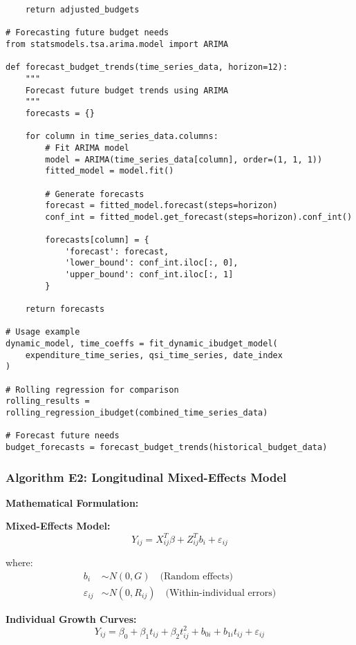 \begin{lstlisting}
    return adjusted_budgets

# Forecasting future budget needs
from statsmodels.tsa.arima.model import ARIMA

def forecast_budget_trends(time_series_data, horizon=12):
    """
    Forecast future budget trends using ARIMA
    """
    forecasts = {}
    
    for column in time_series_data.columns:
        # Fit ARIMA model
        model = ARIMA(time_series_data[column], order=(1, 1, 1))
        fitted_model = model.fit()
        
        # Generate forecasts
        forecast = fitted_model.forecast(steps=horizon)
        conf_int = fitted_model.get_forecast(steps=horizon).conf_int()
        
        forecasts[column] = {
            'forecast': forecast,
            'lower_bound': conf_int.iloc[:, 0],
            'upper_bound': conf_int.iloc[:, 1]
        }
    
    return forecasts

# Usage example
dynamic_model, time_coeffs = fit_dynamic_ibudget_model(
    expenditure_time_series, qsi_time_series, date_index
)

# Rolling regression for comparison
rolling_results = rolling_regression_ibudget(combined_time_series_data)

# Forecast future needs
budget_forecasts = forecast_budget_trends(historical_budget_data)
\end{lstlisting}

\subsubsection{Algorithm E2: Longitudinal Mixed-Effects Model}

\textbf{Mathematical Formulation:}

\textbf{Mixed-Effects Model:}
\begin{equation}
Y_{ij} = X_{ij}^T\beta + Z_{ij}^T b_i + \varepsilon_{ij}
\end{equation}

where:
\begin{align}
b_i &\sim N(0, G) \quad \text{(Random effects)} \\
\varepsilon_{ij} &\sim N(0, R_{ij}) \quad \text{(Within-individual errors)}
\end{align}

\textbf{Individual Growth Curves:}
\begin{equation}
Y_{ij} = \beta_0 + \beta_1 t_{ij} + \beta_2 t_{ij}^2 + b_{0i} + b_{1i}t_{ij} + \varepsilon_{ij}
\end{equation}

